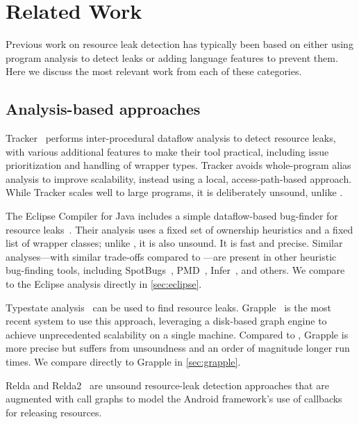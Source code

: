 \section{Related Work}
\label{sec:relatedwork}

Previous work on resource leak detection has typically been based on either
using program analysis to detect leaks or adding language features to prevent
them. Here we discuss the most relevant work from each of these categories.

\subsection{Analysis-based approaches}\label{sec:rw-analysis}


Tracker~\cite{TorlakC10} performs inter-procedural dataflow analysis to detect
resource leaks, with various additional features to make their tool practical,
including issue prioritization and handling of wrapper types.  Tracker avoids
whole-program alias analysis to improve scalability, instead using a local,
access-path-based approach.  While Tracker scales well to large programs, it is
deliberately unsound, unlike \Tool.

The Eclipse Compiler for Java includes a simple dataflow-based
bug-finder for resource leaks~\cite{ecj-resource-leak}. Their analysis
uses a fixed set of ownership heuristics and a fixed list of wrapper
classes; unlike \Tool, it is also unsound. It is fast and
 precise.  Similar analyses---with similar trade-offs
compared to \Tool---are present in other heuristic bug-finding tools,
including SpotBugs~\cite{spotbugs-resource-leak},
PMD~\cite{pmd-resource-leak}, Infer~\cite{infer-resource-leak}, and others.
We compare to the Eclipse analysis directly in \cref{sec:eclipse}.

Typestate analysis~\cite{StromY86,FinkYDRG2008} can be used to
find resource leaks.  Grapple~\cite{zuo2019grapple} is the most recent system to
use this approach, leveraging a disk-based graph engine to achieve unprecedented
scalability on a single machine.  Compared to \Tool, Grapple is more precise but suffers
from unsoundness and an order of magnitude longer run times.
We compare directly to Grapple in \cref{sec:grapple}. 


Relda and Relda2~\cite{guo2013characterizing,wu2016relda2} are unsound
resource-leak detection approaches  that are
augmented with call graphs to model the Android framework's use of callbacks for
releasing resources.

